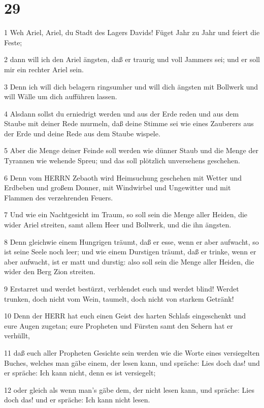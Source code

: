 \chapter{29}

\par 1 Weh Ariel, Ariel, du Stadt des Lagers Davids! Füget Jahr zu Jahr und feiert die Feste;
\par 2 dann will ich den Ariel ängsten, daß er traurig und voll Jammers sei; und er soll mir ein rechter Ariel sein.
\par 3 Denn ich will dich belagern ringsumher und will dich ängsten mit Bollwerk und will Wälle um dich aufführen lassen.
\par 4 Alsdann sollst du erniedrigt werden und aus der Erde reden und aus dem Staube mit deiner Rede murmeln, daß deine Stimme sei wie eines Zauberers aus der Erde und deine Rede aus dem Staube wispele.
\par 5 Aber die Menge deiner Feinde soll werden wie dünner Staub und die Menge der Tyrannen wie wehende Spreu; und das soll plötzlich unversehens geschehen.
\par 6 Denn vom HERRN Zebaoth wird Heimsuchung geschehen mit Wetter und Erdbeben und großem Donner, mit Windwirbel und Ungewitter und mit Flammen des verzehrenden Feuers.
\par 7 Und wie ein Nachtgesicht im Traum, so soll sein die Menge aller Heiden, die wider Ariel streiten, samt allem Heer und Bollwerk, und die ihn ängsten.
\par 8 Denn gleichwie einem Hungrigen träumt, daß er esse, wenn er aber aufwacht, so ist seine Seele noch leer; und wie einem Durstigen träumt, daß er trinke, wenn er aber aufwacht, ist er matt und durstig: also soll sein die Menge aller Heiden, die wider den Berg Zion streiten.
\par 9 Erstarret und werdet bestürzt, verblendet euch und werdet blind! Werdet trunken, doch nicht vom Wein, taumelt, doch nicht von starkem Getränk!
\par 10 Denn der HERR hat euch einen Geist des harten Schlafs eingeschenkt und eure Augen zugetan; eure Propheten und Fürsten samt den Sehern hat er verhüllt,
\par 11 daß euch aller Propheten Gesichte sein werden wie die Worte eines versiegelten Buches, welches man gäbe einem, der lesen kann, und spräche: Lies doch das! und er spräche: Ich kann nicht, denn es ist versiegelt;
\par 12 oder gleich als wenn man's gäbe dem, der nicht lesen kann, und spräche: Lies doch das! und er spräche: Ich kann nicht lesen.

